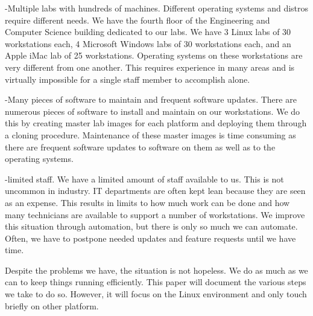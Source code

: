 -Multiple labs with hundreds of machines.  Different operating systems and distros require different needs.
We have the fourth floor of the Engineering and Computer Science building dedicated to our labs.  We have 3 Linux labs of 30 workstations each, 4 Microsoft Windows labs of 30 workstations each, and an Apple iMac lab of 25 workstations.  Operating systems on these workstations are very different from one another.  This requires experience in many areas and is virtually impossible for a single staff member to accomplish alone.   

-Many pieces of software to maintain and frequent software updates.
There are numerous pieces of software to install and maintain on our workstations.  We do this by creating master lab images for each platform and deploying them through a cloning procedure.  Maintenance of these master images is time consuming as there are frequent software updates to software on them as well as to the operating systems.  

-limited staff.
We have a limited amount of staff available to us.  This is not uncommon in industry.  IT departments are often kept lean because they are seen as an expense.  This results in limits to how much work can be done and how many technicians are available to support a number of workstations.  We improve this situation through automation, but there is only so much we can automate.  Often, we have to postpone needed updates and feature requests until we have time.   

Despite the problems we have, the situation is not hopeless.  We do as much as we can to keep things running efficiently.  This paper will document the various steps we take to do so.  However, it will focus on the Linux environment and only touch briefly on other platform.  
